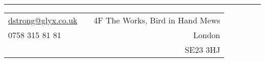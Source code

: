 \documentclass[a4paper,10pt]{article} %
\begin{document}
\pagestyle{empty} %


\\ %
\hrule
\footnotesize{
\begin{tabularx}{\textwidth}{lXr}
\href{mailto:dstrong@glyx.co.uk}{dstrong@glyx.co.uk} & & {4F The Works, Bird in Hand Mews}\\
{0758 315 81 81}                                     & & {London}\\ 
                                                     & & {SE23 3HJ}
\end{tabularx}
}

\end{document}
